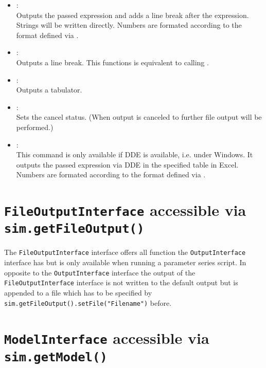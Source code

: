 \begin{itemize}
\item
{}:\\
Outputs the passed expression and adds a line break after the expression.
Strings will be written directly. Numbers are formated according to the format
defined via .

\item
{}:\\
Outputs a line break. This functions is equivalent to calling
.

\item
{}:\\
Outputs a tabulator.

\item
{}:\\
Sets the cancel status. (When output is canceled to further file output will be performed.)

\item
{}:\\
This command is only available if DDE is available, i.e. under Windows.
It outputs the passed expression via DDE in the specified table in Excel.
Numbers are formated according to the format defined via .

\end{itemize}



\chapter{\texttt{FileOutputInterface} accessible via \texttt{sim.getFileOutput()}}

The \texttt{FileOutputInterface} interface offers all function the \texttt{OutputInterface} interface has
but is only available when running a parameter series script. In opposite
to the \texttt{OutputInterface} interface the output of the \texttt{FileOutputInterface} interface
is not written to the default output but is appended to a file which has
to be specified by \texttt{sim.getFileOutput().setFile("{}Filename")} before.



\chapter{\texttt{ModelInterface} accessible via \texttt{sim.getModel()}}


